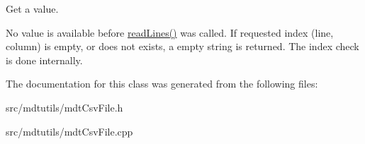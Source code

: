 Get a value. 

No value is available before \hyperlink{classmdt_csv_file_ab2d9754e50db179825813081bb129797}{readLines()} was called. If requested index (line, column) is empty, or does not exists, a empty string is returned. The index check is done internally. 

The documentation for this class was generated from the following files:\begin{DoxyCompactItemize}
\item 
src/mdtutils/mdtCsvFile.h\item 
src/mdtutils/mdtCsvFile.cpp\end{DoxyCompactItemize}
